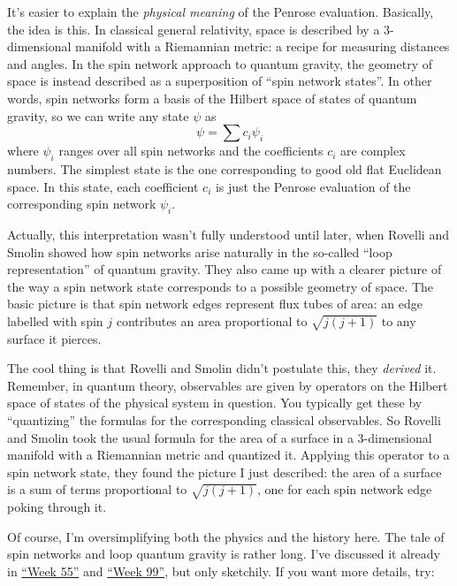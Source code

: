 \documentclass{article}
\def\tightlist{}
\renewcommand{\texttt}[1]{%
  \begingroup
  \ttfamily
  \begingroup\lccode`~=`/\lowercase{\endgroup\def~}{/\discretionary{}{}{}}%
  \begingroup\lccode`~=`[\lowercase{\endgroup\def~}{[\discretionary{}{}{}}%
  \begingroup\lccode`~=`.\lowercase{\endgroup\def~}{.\discretionary{}{}{}}%
  \catcode`/=\active\catcode`[=\active\catcode`.=\active
  \scantokens{#1\noexpand}%
  \endgroup
}
\begin{document}
It's easier to explain the \emph{physical meaning} of the Penrose
evaluation. Basically, the idea is this. In classical general
relativity, space is described by a 3-dimensional manifold with a
Riemannian metric: a recipe for measuring distances and angles. In the
spin network approach to quantum gravity, the geometry of space is
instead described as a superposition of ``spin network states''. In
other words, spin networks form a basis of the Hilbert space of states
of quantum gravity, so we can write any state \(\psi\) as
\[\psi = \sum c_i \psi_i\] where \(\psi_i\) ranges over all spin
networks and the coefficients \(c_i\) are complex numbers. The simplest
state is the one corresponding to good old flat Euclidean space. In this
state, each coefficient \(c_i\) is just the Penrose evaluation of the
corresponding spin network \(\psi_i\).

Actually, this interpretation wasn't fully understood until later, when
Rovelli and Smolin showed how spin networks arise naturally in the
so-called ``loop representation'' of quantum gravity. They also came up
with a clearer picture of the way a spin network state corresponds to a
possible geometry of space. The basic picture is that spin network edges
represent flux tubes of area: an edge labelled with spin \(j\)
contributes an area proportional to \(\sqrt{j(j+1)}\) to any surface it
pierces.

The cool thing is that Rovelli and Smolin didn't postulate this, they
\emph{derived} it. Remember, in quantum theory, observables are given by
operators on the Hilbert space of states of the physical system in
question. You typically get these by ``quantizing'' the formulas for the
corresponding classical observables. So Rovelli and Smolin took the
usual formula for the area of a surface in a 3-dimensional manifold with
a Riemannian metric and quantized it. Applying this operator to a spin
network state, they found the picture I just described: the area of a
surface is a sum of terms proportional to \(\sqrt{j(j+1)}\), one for
each spin network edge poking through it.

Of course, I'm oversimplifying both the physics and the history here.
The tale of spin networks and loop quantum gravity is rather long. I've
discussed it already in \protect\hyperlink{week55}{``Week 55''} and
\protect\hyperlink{week99}{``Week 99''}, but only sketchily. If you want
more details, try:

\end{document}
